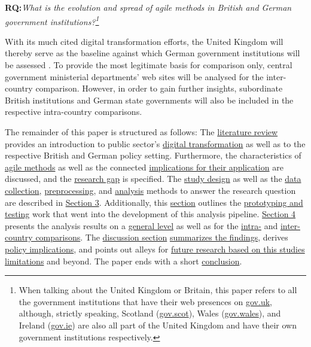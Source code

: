 \begin{addmargin}[2em]{2em}%
\textbf{RQ:}\textit{What is the evolution and spread of agile methods in British and German government institutions?\footnote{When talking about the United Kingdom or Britain, this paper refers to all the government institutions that have their web presences on \href{https://gov.uk}{gov.uk}, although, strictly speaking, Scotland (\href{https://gov.scot}{gov.scot}), Wales (\href{https://gov.wales}{gov.wales}), and Ireland (\href{https://gov.ie}{gov.ie}) are also all part of the United Kingdom and have their own government institutions respectively.}}\label{RQ1}
\end{addmargin}\par 

With its much cited digital transformation efforts, the United Kingdom will thereby serve as the baseline against which German government institutions will be assessed \parencite{Sivarajah2014, Clarke2019}. To provide the most legitimate basis for comparison only, central government ministerial departments' web sites will be analysed for the inter-country comparison. However, in order to gain further insights, subordinate British institutions and German state governments will also be included in the respective intra-country comparisons.

The remainder of this paper is structured as follows: The \hyperref[Literature Review]{literature review} provides an introduction to public sector's \hyperref[Digital Transformation]{digital transformation} as well as to the respective British and German policy setting. Furthermore, the characteristics of \hyperref[Agile Methods]{agile methods} as well as the connected \hyperref[Benefits, Challenges, and Conditions]{implications for their application} are discussed, and the \hyperref[Research Gap]{research gap} is specified. The 
\hyperref[Study Design]{study design} as well as the \hyperref[Data Collection]{data collection}, \hyperref[Data Preprocessing]{preprocessing}, and \hyperref[Data Analysis and Visualisation]{analysis} methods to answer the research question are described in \hyperref[Methods]{Section 3}. Additionally, this \hyperref[Methods]{section} outlines the \hyperref[Prototyping and Testing]{prototyping and testing} work that went into the development of this analysis pipeline. \hyperref[Analysis]{Section 4} presents the analysis results on a \hyperref[General Level]{general level} as well as for the \hyperref[Intra-Country Comparison]{intra-} and \hyperref[Inter-Country Comparison]{inter-country comparisons}. The \hyperref[Discussion]{discussion section} \hyperref[Summary of Findings]{summarizes the findings}, derives \hyperref[Policy Implications]{policy implications}, and points out alleys for \hyperref[Limitations and Future Work]{future research based on this studies limitations} and beyond. The paper ends with a short \hyperref[Conclusion]{conclusion}.



